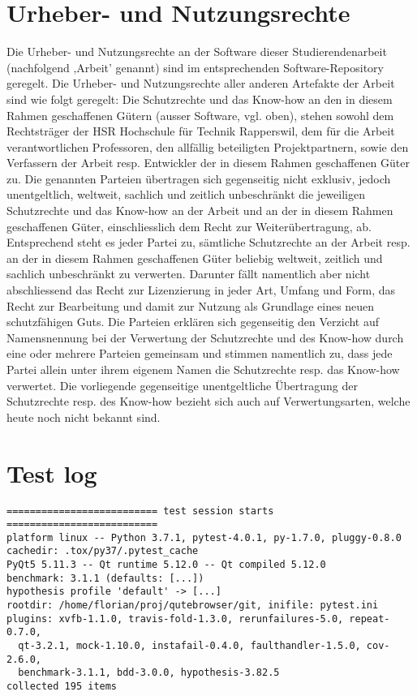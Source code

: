 \begin{appendices}
\chapter{Urheber- und Nutzungsrechte}
Die Urheber- und Nutzungsrechte an der Software dieser Studierendenarbeit (nachfolgend ‚Arbeit’ genannt) sind im entsprechenden Software-Repository geregelt. Die Urheber- und Nutzungsrechte aller anderen Artefakte der Arbeit sind wie folgt geregelt: Die
Schutzrechte und das Know-how an den in diesem Rahmen geschaffenen Gütern (ausser Software, vgl. oben), stehen sowohl dem Rechtsträger der HSR Hochschule für Technik Rapperswil, dem für die Arbeit verantwortlichen Professoren, den allfällig beteiligten
Projektpartnern, sowie den Verfassern der Arbeit resp. Entwickler der in diesem Rahmen geschaffenen Güter zu. Die genannten Parteien übertragen sich gegenseitig nicht exklusiv, jedoch unentgeltlich, weltweit, sachlich und zeitlich unbeschränkt die
jeweiligen Schutzrechte und das Know-how an der Arbeit und an der in diesem Rahmen geschaffenen Güter, einschliesslich dem Recht zur Weiterübertragung, ab. Entsprechend steht es jeder Partei zu, sämtliche Schutzrechte an der Arbeit resp. an der in diesem
Rahmen geschaffenen Güter beliebig weltweit, zeitlich und sachlich unbeschränkt zu verwerten. Darunter fällt namentlich aber nicht abschliessend das Recht zur Lizenzierung in jeder Art, Umfang und Form, das Recht zur Bearbeitung und damit zur Nutzung als
Grundlage eines neuen schutzfähigen Guts. Die Parteien erklären sich gegenseitig den Verzicht auf Namensnennung bei der Verwertung der Schutzrechte und des Know-how durch eine oder mehrere Parteien gemeinsam und stimmen namentlich zu, dass jede Partei
allein unter ihrem eigenem Namen die Schutzrechte resp. das Know-how verwertet. Die vorliegende gegenseitige unentgeltliche Übertragung der Schutzrechte resp. des Know-how bezieht sich auch auf Verwertungsarten, welche heute noch nicht bekannt sind.



\chapter{Test log}
\label{ch:testlog}
\begin{verbatim}
========================== test session starts ==========================
platform linux -- Python 3.7.1, pytest-4.0.1, py-1.7.0, pluggy-0.8.0
cachedir: .tox/py37/.pytest_cache
PyQt5 5.11.3 -- Qt runtime 5.12.0 -- Qt compiled 5.12.0
benchmark: 3.1.1 (defaults: [...])
hypothesis profile 'default' -> [...]
rootdir: /home/florian/proj/qutebrowser/git, inifile: pytest.ini
plugins: xvfb-1.1.0, travis-fold-1.3.0, rerunfailures-5.0, repeat-0.7.0,
  qt-3.2.1, mock-1.10.0, instafail-0.4.0, faulthandler-1.5.0, cov-2.6.0,
  benchmark-3.1.1, bdd-3.0.0, hypothesis-3.82.5
collected 195 items


\end{verbatim}
\end{appendices}
